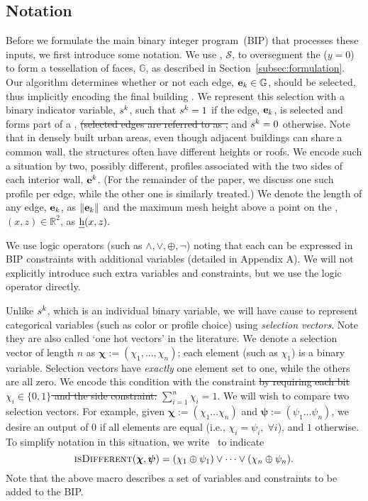 \subsection{Notation}
\label{sec:notation}
%
Before we formulate the main binary integer program~(BIP) that processes these inputs, we first introduce some notation. We use \sweepedges, $\mathcal{S}$, to oversegment the \groundplane ($y=0$) to form a tessellation of faces, $\mathbb{G}$, as described in Section~\ref{subsec:formulation}. 
%
Our algorithm determines whether or not each edge, $\mathbf{e}_k \in \mathbb{G}$,  should be selected, thus implicitly encoding the final building \footprintpolygons. We represent this selection with a binary indicator variable,  $s^k$, such that $s^k=1$ if the edge, $\mathbf{e}_k$, is selected and forms part of a \footprintpolygon,\sout{ (selected edges are referred to as \emph{\planedges},} and $s^k=0$ otherwise. 
%
Note that in densely built urban areas, even though adjacent buildings can share a common wall, the structures often have different heights or roofs.
We encode such a situation by  two, possibly different, profiles associated with the two sides of each interior wall, $\mathbf{e}^k$. (For the remainder of the paper, we discuss one such profile per edge, while the other one is similarly treated.)  We denote the length of any edge, $\mathbf{e}_k$, as $\|\mathbf{e}_k\|$  and the
maximum mesh height above a point on the \groundplane, $(x,z) \in \mathbb{R}^2$, 
as 
$\text{\emph{h}}{}(x,z).$


We use logic operators (such as $\land, \lor, \oplus, \neg$) noting that each can be expressed in BIP constraints with additional variables (detailed in Appendix A).
We will not explicitly introduce such extra variables and constraints, but we use the logic operator directly.

Unlike $s^k$, which is an individual binary variable, we will have cause to represent categorical variables (such as color or profile choice) using \emph{selection vectors}. Note they are also called `one hot vectors' in the literature.
We denote a selection vector of length $n$ as $\mathbold{\chi}:=(\chi_1,\dots,\chi_n)$; each element (such as $\chi_1$) is a binary variable. Selection vectors have {\em exactly} one element set to one, while the others are all zero. We encode this condition  with the constraint
\sout{by requiring each bit $\chi_i\in\{0,1\}$ and the \sout{side }constraint:}
$
\sum_{i=1}^n{\chi_i} = 1.
$
We will wish to compare two selection vectors. For example, given $\mathbold{\chi}:=(\chi_1...\chi_n)$ and $\mathbold{\psi}:=(\psi_1...\psi_n)$, we desire an output of $0$ if all elements are equal (i.e., $\chi_i = \psi_i, \; \forall i$), and $1$ otherwise. To simplify notation in this situation, we  write
\isDifferent{\mathbold{\chi}, \mathbold{\psi}}\ to indicate 
$$
\isDifferent{\mathbold{\chi},
\mathbold{\psi}} = (\chi_1 \oplus \psi_1)\lor \dots \lor (\chi_n \oplus \psi_n). 
$$
Note that the above macro describes a set of variables and constraints to be added to the BIP. 



